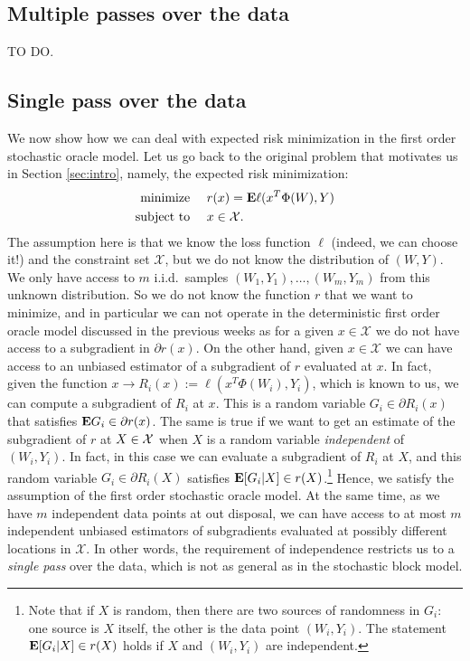 \subsection{Multiple passes over the data}
TO DO.

\subsection{Single pass over the data}
We now show how we can deal with expected risk minimization in the first order stochastic oracle model.
Let us go back to the original problem that motivates us in Section \ref{sec:intro}, namely, the expected risk minimization:
\begin{align*}
	\begin{aligned}
		\text{minimize }\quad   & r(x) = \mathbf{E}\ell(x^T\Phi(W),Y) \\
		\text{subject to }\quad & x\in \mathcal{X}.
	\end{aligned}
\end{align*}
The assumption here is that we know the loss function $\ell$ (indeed, we can choose it!) and the constraint set $\mathcal{X}$, but we do not know the distribution of $(W,Y)$. We only have access to $m$ i.i.d.\ samples $(W_1,Y_1),\ldots,(W_m,Y_m)$ from this unknown distribution. So we do not know the function $r$ that we want to minimize, and in particular we can not operate in the deterministic first order oracle model discussed in the previous weeks as for a given $x\in\mathcal{X}$ we do not have access to a subgradient in $\partial r(x)$. On the other hand, given $x\in\mathcal{X}$ we can have access to an unbiased estimator of a subgradient of $r$ evaluated at $x$. In fact, given the function $x \rightarrow R_i(x) := \ell(x^T\Phi(W_i),Y_i)$, which is known to us, we can compute a subgradient of $R_i$ at $x$. This is a random variable $G_i\in \partial R_i(x)$ that satisfies $\mathbf{E} G_i \in \partial r(x)$. The same is true if we want to get an estimate of the subgradient of $r$ at $X\in\mathcal{X}$ when $X$ is a random variable \emph{independent} of $(W_i,Y_i)$. In fact, in this case we can evaluate a subgradient of $R_i$ at $X$, and this random variable $G_i\in \partial R_i(X)$ satisfies $\mathbf{E}[G_i|X]\in r(X)$.\footnote{Note that if $X$ is random, then there are two sources of randomness in $G_i$: one source is $X$ itself, the other is the data point $(W_i,Y_i)$. The statement $\mathbf{E}[G_i|X]\in r(X)$ holds if $X$ and $(W_i,Y_i)$ are independent.} Hence, we satisfy the assumption of the first order stochastic oracle model. At the same time, as we have $m$ independent data points at out disposal, we can have access to at most $m$ independent unbiased estimators of subgradients evaluated at possibly different locations in $\mathcal{X}$. In other words, the requirement of independence restricts us to a \emph{single pass} over the data, which is not as general as in the stochastic block model.

